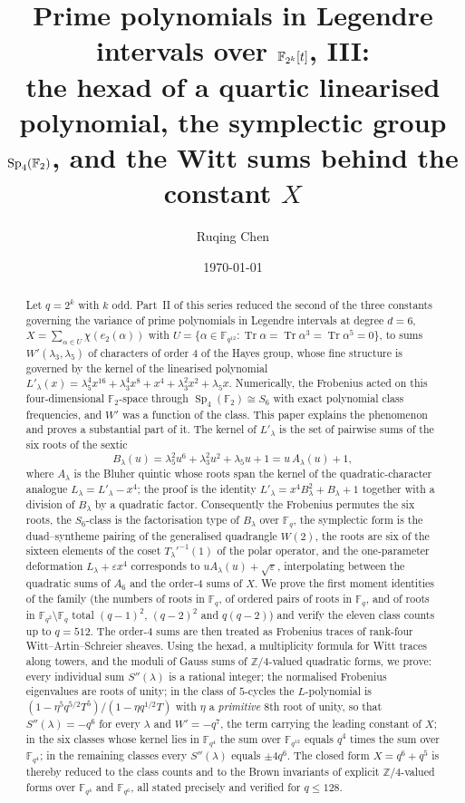 \documentclass[12pt,a4paper]{amsart}
\title[Legendre intervals in even characteristic, III]{Prime polynomials in Legendre intervals over \texorpdfstring{$\F_{2^k}[t]$}{F(2k)[t]}, III:\texorpdfstring{\\}{ }the hexad of a quartic linearised polynomial, the symplectic group \texorpdfstring{$\Sp_4(\F_2)$}{Sp4(F2)}, and the Witt sums behind the constant \texorpdfstring{$X$}{X}}
\author{Ruqing Chen}
\date{\today}
\theoremstyle{definition}
\newcommand{\F}{\mathbb{F}}
\newcommand{\Z}{\mathbb{Z}}
\newcommand{\Tr}{\operatorname{Tr}}
\newcommand{\Sp}{\operatorname{Sp}}
\newcommand{\eps}{\varepsilon}
\newcommand{\Spp}{S''}
\begin{document}
\begin{abstract}
Let $q=2^k$ with $k$ odd. Part~II of this series reduced the second of the three constants governing the variance of prime polynomials in Legendre intervals at degree $d=6$, $X=\sum_{\alpha\in U}\chi(e_2(\alpha))$ with $U=\{\alpha\in\F_{q^{12}}:\Tr\alpha=\Tr\alpha^3=\Tr\alpha^5=0\}$, to sums $W'(\lambda_3,\lambda_5)$ of characters of order $4$ of the Hayes group, whose fine structure is governed by the kernel of the linearised polynomial $L'_\lambda(x)=\lambda_5^4x^{16}+\lambda_3^4x^8+x^4+\lambda_3^2x^2+\lambda_5x$. Numerically, the Frobenius acted on this four-dimensional $\F_2$-space through $\Sp_4(\F_2)\cong S_6$ with exact polynomial class frequencies, and $W'$ was a function of the class. This paper explains the phenomenon and proves a substantial part of it. The kernel of $L'_\lambda$ is the set of pairwise sums of the six roots of the sextic
\[
B_\lambda(u)=\lambda_5^2u^6+\lambda_3^2u^2+\lambda_5u+1=u\,A_\lambda(u)+1,
\]
where $A_\lambda$ is the Bluher quintic whose roots span the kernel of the quadratic-character analogue $L_\lambda=L'_\lambda-x^4$; the proof is the identity $L'_\lambda=x^4B_\lambda^2+B_\lambda+1$ together with a division of $B_\lambda$ by a quadratic factor. Consequently the Frobenius permutes the six roots, the $S_6$-class is the factorisation type of $B_\lambda$ over $\F_q$, the symplectic form is the duad--syntheme pairing of the generalised quadrangle $W(2)$, the roots are six of the sixteen elements of the coset $T_\lambda'^{-1}(1)$ of the polar operator, and the one-parameter deformation $L_\lambda+\eps x^4$ corresponds to $uA_\lambda(u)+\sqrt\eps$, interpolating between the quadratic sums of $A_6$ and the order-$4$ sums of $X$. We prove the first moment identities of the family (the numbers of roots in $\F_q$, of ordered pairs of roots in $\F_q$, and of roots in $\F_{q^2}\setminus\F_q$ total $(q-1)^2$, $(q-2)^2$ and $q(q-2)$) and verify the eleven class counts up to $q=512$. The order-$4$ sums are then treated as Frobenius traces of rank-four Witt--Artin--Schreier sheaves. Using the hexad, a multiplicity formula for Witt traces along towers, and the moduli of Gauss sums of $\Z/4$-valued quadratic forms, we prove: every individual sum $\Spp(\lambda)$ is a rational integer; the normalised Frobenius eigenvalues are roots of unity; in the class of $5$-cycles the $L$-polynomial is $(1-\eta^5q^{5/2}T^5)/(1-\eta q^{1/2}T)$ with $\eta$ a \emph{primitive} $8$th root of unity, so that $\Spp(\lambda)=-q^6$ for every $\lambda$ and $W'=-q^7$, the term carrying the leading constant of $X$; in the six classes whose kernel lies in $\F_{q^4}$ the sum over $\F_{q^{12}}$ equals $q^4$ times the sum over $\F_{q^4}$; in the remaining classes every $\Spp(\lambda)$ equals $\pm4q^6$. The closed form $X=q^6+q^5$ is thereby reduced to the class counts and to the Brown invariants of explicit $\Z/4$-valued forms over $\F_{q^4}$ and $\F_{q^6}$, all stated precisely and verified for $q\le128$.
\end{abstract}
\end{document}
